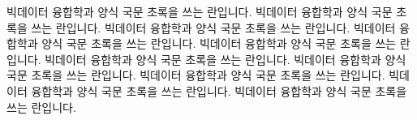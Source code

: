 빅데이터 융합학과 양식 국문 초록을 쓰는 란입니다.
빅데이터 융합학과 양식 국문 초록을 쓰는 란입니다.
빅데이터 융합학과 양식 국문 초록을 쓰는 란입니다.
빅데이터 융합학과 양식 국문 초록을 쓰는 란입니다.
빅데이터 융합학과 양식 국문 초록을 쓰는 란입니다.
빅데이터 융합학과 양식 국문 초록을 쓰는 란입니다.
빅데이터 융합학과 양식 국문 초록을 쓰는 란입니다.
빅데이터 융합학과 양식 국문 초록을 쓰는 란입니다.
빅데이터 융합학과 양식 국문 초록을 쓰는 란입니다.
빅데이터 융합학과 양식 국문 초록을 쓰는 란입니다.